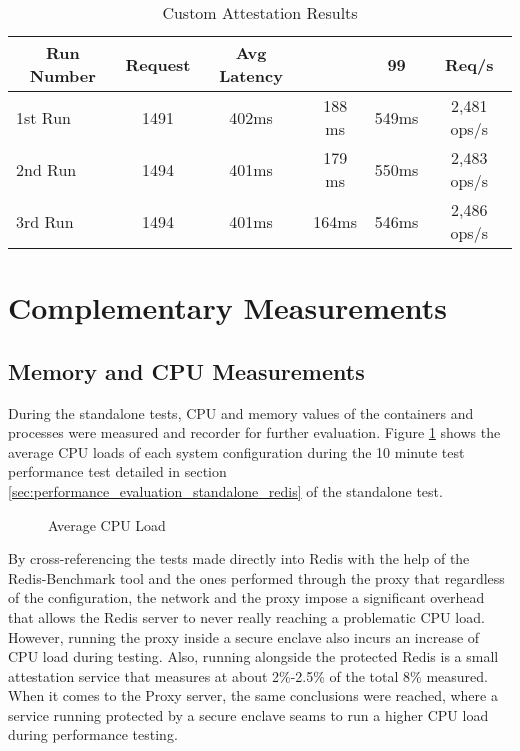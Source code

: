 \begin{table}[ht]
	\caption{Custom Attestation Results}
	\label{tab:custom_attestation_results}
\centering
\begin{tabular}{lccccc}
	\toprule
	\multicolumn{1}{c}{\textbf{Run Number}} & \pmb{\#}\textbf{Request} & \textbf{Avg Latency} & \pmb{\ensuremath{\sigma}} & \textbf{99}\pmb{\%} & \textbf{Req/s} \\
	\midrule
		1st Run & 1491 & 402ms & 188	ms & 549ms & 2,481 ops/s \\
		2nd Run & 1494 & 401ms & 179	ms & 550ms & 2,483 ops/s \\
		3rd Run & 1494 & 401ms & 164ms & 546ms & 2,486 ops/s \\
	\bottomrule
\end{tabular}
\end{table}

\section{Complementary Measurements}
\label{sec:complementary_measurements}

\subsection{Memory and CPU Measurements}
\label{ssec:memory_and_cpu_measurements}

During the standalone tests, \gls{CPU} and memory values of the containers and processes were measured and recorder for further evaluation. Figure \ref{fig:average_cpu_load} shows the average \gls{CPU} loads of each system configuration during the 10 minute test performance test detailed in section \ref{sec:performance_evaluation_standalone_redis} of the standalone test.

\begin{figure}[htbp]
  \caption{Average CPU Load}
  \label{fig:average_cpu_load}
\end{figure}

By cross-referencing the tests made directly into Redis with the help of the Redis-Benchmark tool and the ones performed through the proxy that regardless of the configuration, the network and the proxy impose a significant overhead that allows the Redis server to never really reaching a problematic \gls{CPU} load. However, running the proxy inside a secure enclave also incurs an increase of \gls{CPU} load during testing. Also, running alongside the protected Redis is a small attestation service that measures at about 2\%-2.5\% of the total 8\% measured. When it comes to the Proxy server, the same conclusions were reached, where a service running protected by a secure enclave seams to run a higher \gls{CPU} load during performance testing.


